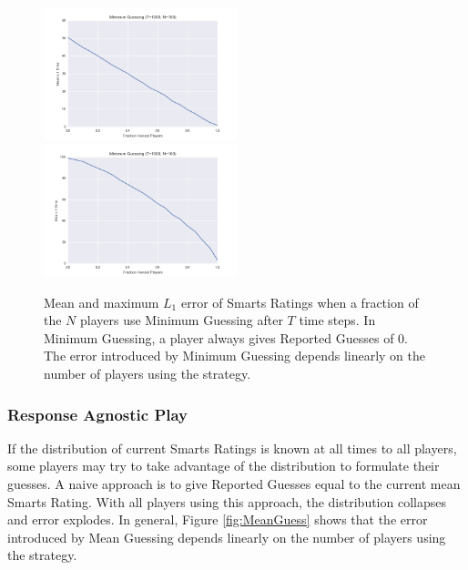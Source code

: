 \begin{figure}[h]
\centerline{%
\includegraphics[width=0.5\textwidth]{figures/robustness/Minimum_Guessing31.png}%
\includegraphics[width=0.5\textwidth] {figures/robustness/Minimum_Guessing32.png}%
}%
\caption{Mean and maximum $L_1$ error of Smarts Ratings when a fraction of the $N$ players use Minimum Guessing after $T$ time steps. In Minimum Guessing, a player always gives Reported Guesses of $0$. The error introduced by Minimum Guessing depends linearly on the number of players using the strategy.}
\label{fig:MinimumGuess}
\end{figure}

\subsubsection{Response Agnostic Play}

If the distribution of current Smarts Ratings is known at all times to all players, some players may try to take advantage of the distribution to formulate their guesses. A naive approach is to give Reported Guesses equal to the current mean Smarts Rating. With all players using this approach, the distribution collapses and error explodes. In general, Figure \ref{fig:MeanGuess} shows that the error introduced by Mean Guessing depends linearly on the number of players using the strategy.

